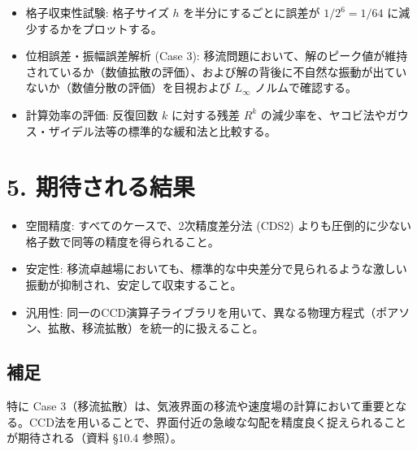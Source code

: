 \documentclass[12pt, a4paper, titlepage]{article}
\begin{document}
\begin{itemize}
    \item 格子収束性試験: 格子サイズ $h$ を半分にするごとに誤差が $1/2^6 = 1/64$ に減少するかをプロットする。
    \item 位相誤差・振幅誤差解析 (Case 3): 移流問題において、解のピーク値が維持されているか（数値拡散の評価）、および解の背後に不自然な振動が出ていないか（数値分散の評価）を目視および $L_\infty$ ノルムで確認する。
    \item 計算効率の評価: 反復回数 $k$ に対する残差 $R^k$ の減少率を、ヤコビ法やガウス・ザイデル法等の標準的な緩和法と比較する。
\end{itemize}

\section*{5. 期待される結果}
\begin{itemize}
    \item 空間精度: すべてのケースで、2次精度差分法 (CDS2) よりも圧倒的に少ない格子数で同等の精度を得られること。
    \item 安定性: 移流卓越場においても、標準的な中央差分で見られるような激しい振動が抑制され、安定して収束すること。
    \item 汎用性: 同一のCCD演算子ライブラリを用いて、異なる物理方程式（ポアソン、拡散、移流拡散）を統一的に扱えること。
\end{itemize}

\subsection*{補足}
特に Case 3（移流拡散）は、気液界面の移流や速度場の計算において重要となる。CCD法を用いることで、界面付近の急峻な勾配を精度良く捉えられることが期待される（資料 §10.4 参照）。
\end{document}
